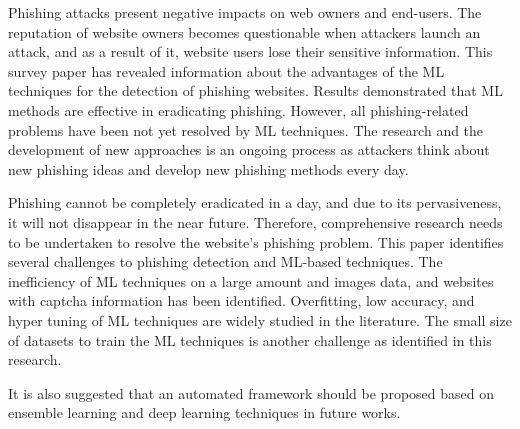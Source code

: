 Phishing attacks present negative impacts on web owners and end-users. The reputation of website owners becomes questionable when attackers launch an attack, and as a result of it, website users lose their sensitive information. This survey paper has revealed information about the advantages of the ML techniques for the detection of phishing websites. Results demonstrated that ML methods are effective in eradicating phishing. However, all phishing-related problems have been not yet resolved by ML techniques. The research and the development of new approaches is an ongoing process as attackers think about new phishing ideas and develop new phishing methods every day.

Phishing cannot be completely eradicated in a day, and due to its pervasiveness, it will not disappear in the near future. Therefore, comprehensive research needs to be undertaken to resolve the website's phishing problem. This paper identifies several challenges to phishing detection and ML-based techniques. The inefficiency of ML techniques on a large amount and images data, and websites with captcha information has been identified. Overfitting, low accuracy, and hyper tuning of ML techniques are widely studied in the literature. The small size of datasets to train the ML techniques is another challenge as identified in this research.

It is also suggested that an automated framework should be proposed based on ensemble learning and deep learning techniques in future works.

